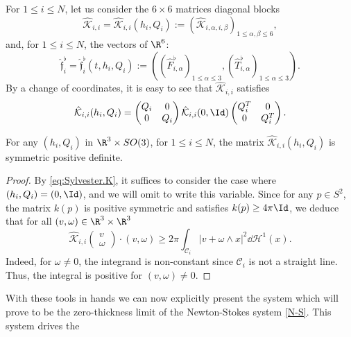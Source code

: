 For $1 \leq i \leq N$, let us consider the $6 \times 6$ matrices diagonal blocks
\begin{equation} \label{hatKblock}
\hat{\mathcal K}_{i,i}{=\hat{\mathcal K}_{i,i}(h_i,Q_i)} := (\hat{\mathcal K}_{i,\alpha,i,\beta})_{1 \leq \alpha,\beta \leq 6},
\end{equation}
and, for $1 \leq i \leq N$,
the vectors of $\R^6$:
\begin{equation} \label{def:f.hat.flat.frac}
\hat{\mathfrak{f}}_i^\flat {=\hat{\mathfrak{f}}_i^\flat(t,h_i,Q_i) }:= ((\hat{F}^\flat_{i,\alpha})_{1 \leq \alpha\leq 3}, (\hat{T}^\flat_{i,\alpha})_{1 \leq \alpha\leq 3}).
\end{equation}
By a change of coordinates, it is easy to see that $\hat {\mathcal K}_{i,i}$
satisfies
\begin{equation} \label{eq:Sylvester.K}
\hat{\mathcal K}_{i,i}(h_i,Q_i)
= \begin{pmatrix} Q_i & 0 \\ 0 & Q_i \end{pmatrix} \hat{\mathcal K}_{i,i}(0, \Id) \begin{pmatrix} Q_i^T & 0 \\ 0 & Q_i^T \end{pmatrix}.
\end{equation}
\begin{Lemma} \label{hat-inverse}
For any $(h_i,Q_i)$ in $\R^3 \times SO(3)$, for $1 \leq i \leq N$, the matrix $\hat{\mathcal K}_{i,i}(h_i,Q_i)$ is symmetric positive definite.
\end{Lemma}
\begin{proof}
By \eqref{eq:Sylvester.K}, it suffices to consider the case where $(h_i,Q_i) = (0,\Id)$, and we will omit to write this variable.
Since for any {$p\in S^2$}, the matrix $k(p)$ is positive symmetric and satisfies $k(p) \geq {4\pi}
\Id$, we deduce that for all $(v,\omega) \in \R^3 \times \R^3$
\begin{equation} \label{eq:K.hat.coercive}
\hat{\mathcal K}_{i,i} \begin{pmatrix} v\\ \omega \end{pmatrix} \cdot (v,\omega) \geq 2\pi
\int_{\mathcal{C}_i} | v + \omega \wedge x|^2 \dd \mathcal{H}^1 (x).
\end{equation}
Indeed, for $\omega \neq 0$, the integrand is non-constant since $\mathcal{C}_i$ is not a straight line. Thus, the integral is positive for $(v,\omega) \neq 0$.
\end{proof}
With these tools in hands we can now explicitly present the system which will prove to be the zero-thickness limit of the Newton-Stokes system \eqref{N-S}. This system drives the
